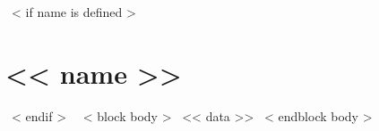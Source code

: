~< if name is defined >~\section{<< name >>}~< endif >~
    ~< block body >~
      << data >>
    ~< endblock body >~